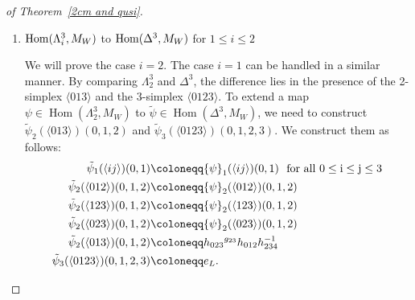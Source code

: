 \documentclass{tac}
\begin{document}
\begin{proof}[of Theorem~\ref{2cm and qusi}]
\begin{enumerate}
For any \( \psi \in \operatorname{Hom}(\Lambda^2_1, M_W) \), the map \( \psi \) is determined by  
\( \psi_1(\langle 01 \rangle)(0,1) \) and \( \psi_1(\langle 12 \rangle)(0,1) \).
To extend \( \psi \) to \( \tilde{\psi} \in \operatorname{Hom}(\Delta^2, M_W) \),  
it suffices to construct  
\( \tilde{\psi}_1(\langle 02 \rangle)(0,1) \) and \( \tilde{\psi}_2(\langle 012 \rangle)(0,1,2) \).
We construct these as follows:  
\begin{align*}
\tilde{\psi}_1(\langle 01 \rangle)(0,1) &\coloneqq {\psi}_1(\langle 01 \rangle)(0,1)\\
\tilde{\psi}_1(\langle 12 \rangle)(0,1) &\coloneqq {\psi}_1(\langle 12 \rangle)(0,1)\\
\tilde{\psi}_1(\langle 02 \rangle)(0,1) &\coloneqq \psi_1(\langle 12\rangle)(0,1)\cdot \psi_1(\langle 01\rangle)(0,1)\\
\tilde{\psi}_2(\langle 012 \rangle)(0,1,2) &\coloneqq e_H
.
\end{align*}
It is easy to see that \( \tilde{\psi} \) is an element of \( \operatorname{Hom}(\Delta^2, M_W) \).


\item ${\rm Hom}(\Lambda^3_i, M_W)$ to ${\rm Hom}(\Delta^3, M_W)$ for $1 \le i \le 2$

We will prove the case \( i = 2 \). The case \( i = 1 \) can be handled in a similar manner.
By comparing \( \Lambda^3_2 \) and \( \Delta^3 \), the difference lies in the presence of the 2-simplex \( \langle 013 \rangle \) and the 3-simplex \( \langle 0123 \rangle \).  
To extend a map \( \psi \in \operatorname{Hom}(\Lambda^3_2, M_W) \) to  
\( \tilde{\psi} \in \operatorname{Hom}(\Delta^3, M_W) \),  
we need to construct $\tilde{\psi}_2(\langle 013 \rangle)(0,1,2)$ and $\tilde{\psi}_3(\langle 0123 \rangle)(0,1,2,3)$. We construct them as follows:
\begin{align*}
\tilde{\psi}_1(\langle ij \rangle)(0,1) &\coloneqq {\psi}_1(\langle ij \rangle)(0,1) \ {\rm\ for\ all\ 0\le i\le j \le 3}\\
\tilde{\psi}_2(\langle 012 \rangle)(0,1,2) &\coloneqq {\psi}_2(\langle 012 \rangle)(0,1,2) \\
\tilde{\psi}_2(\langle 123 \rangle)(0,1,2) &\coloneqq {\psi}_2(\langle 123 \rangle)(0,1,2) \\
\tilde{\psi}_2(\langle 023 \rangle)(0,1,2) &\coloneqq {\psi}_2(\langle 023 \rangle)(0,1,2) \\
\tilde{\psi}_2(\langle 013 \rangle)(0,1,2) &\coloneqq h_{023}{^{g_{23}}}h_{012}h^{-1}_{234}\\
\tilde{\psi}_3(\langle 0123 \rangle)(0,1,2,3) &\coloneqq e_L.
\end{align*}


\end{enumerate}
\end{proof}
\end{document}
